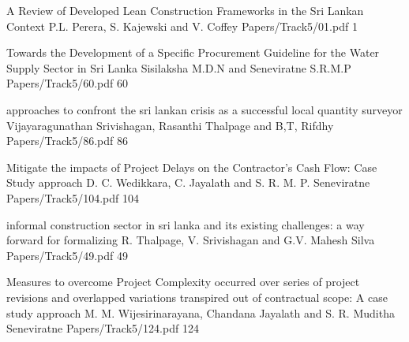 



   \addpaper
    	{A Review of Developed Lean Construction Frameworks in the Sri Lankan Context}
   		 {P.L. Perera, S. Kajewski and V. Coffey} 
   		 {Papers/Track5/01.pdf}
        {1} 

       \addpaper
    	{Towards the Development of a Specific Procurement Guideline for the Water Supply Sector in Sri Lanka}
   		 {Sisilaksha M.D.N and Seneviratne S.R.M.P} 
   		 {Papers/Track5/60.pdf}
        {60}



        \addpaper
    	{approaches to confront the sri lankan crisis as a successful local quantity surveyor}
   		 {Vijayaragunathan Srivishagan, Rasanthi Thalpage and B,T, Rifdhy} 
   		 {Papers/Track5/86.pdf}
        {86}

        \addpaper
    	{Mitigate the impacts of Project Delays on the Contractor’s Cash Flow: Case Study approach}
   		 {D. C. Wedikkara, C. Jayalath and S. R. M. P. Seneviratne} 
   		 {Papers/Track5/104.pdf}
        {104}

        \addpaper
    	{informal construction sector in sri lanka and its existing challenges: a way forward for formalizing}
   		 {R. Thalpage, V. Srivishagan and G.V. Mahesh Silva} 
   		 {Papers/Track5/49.pdf}
        {49}

        \addpaper
    	{Measures to overcome Project Complexity occurred over series of project revisions and overlapped variations transpired out of contractual scope: A case study approach}
   		 {M. M. Wijesirinarayana, Chandana Jayalath and S. R. Muditha Seneviratne} 
   		 {Papers/Track5/124.pdf}
        {124}


